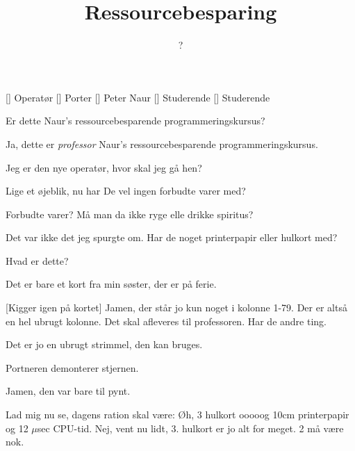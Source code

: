 \documentclass[a4paper,11pt]{article}
\title{Ressourcebesparing}
\author{?}
\begin{document}
\maketitle

\begin{roles}
[] Operatør
[] Porter
[] Peter Naur
[] Studerende
[] Studerende
\end{roles}

\begin{sketch}


   Er dette Naur's ressourcebesparende programmeringskursus?

   Ja, dette er {\em professor} Naur's ressourcebesparende
  programmeringskursus.

   Jeg er den nye operatør, hvor skal jeg gå hen?

   Lige et øjeblik, nu har De vel ingen forbudte varer med?

   Forbudte varer?  Må man da ikke ryge elle drikke spiritus?

   Det var ikke det jeg spurgte om.  Har de noget printerpapir eller hulkort med?


   Hvad er dette?

   Det er bare et kort fra min søster, der er på ferie.

  [Kigger igen på kortet] Jamen, der står jo kun noget i
  kolonne 1-79.  Der er altså en hel ubrugt kolonne.  Det skal
  afleveres til professoren.  Har de andre ting.


   Det er jo en ubrugt strimmel, den kan bruges.

   Portneren demonterer stjernen.

   Jamen, den var bare til pynt.



   Lad mig nu se, dagens ration skal være: Øh, 3 hulkort
  ooooog 10cm printerpapir og 12 $\mu{}$sec CPU-tid.  Nej, vent nu lidt,
  3. hulkort er jo alt for meget.  2 må være nok.


\end{sketch}
\end{document}
